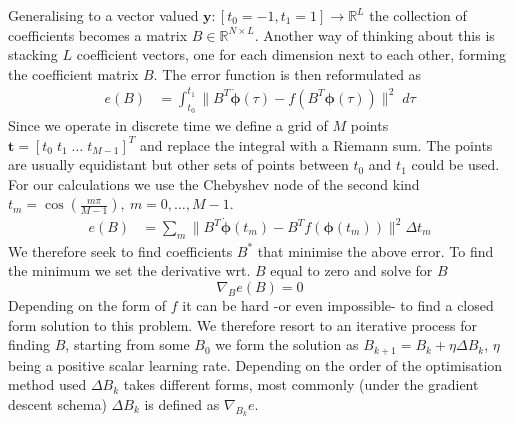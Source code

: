 \documentclass[11pt]{article}
\begin{document}
    Generalising to a vector valued $\pmb{y} : [t_0=-1,t_1=1] \to \mathbb{R}^L$ the collection of coefficients becomes a matrix $B\in \mathbb{R}^{N \times L}$.
    Another way of thinking about this is stacking $L$ coefficient vectors, one for each dimension next to each other, forming the coefficient matrix $B$.
    The error function is then reformulated as
    \begin{align}
        e(B) &= \int_{t_0}^{t_1} \lVert
        B^T \pmb{\dot\phi}(\tau)   -
        f (B^T  \pmb\phi(\tau)  )
        \rVert^2
        \; d\tau
        \label{approx_error}
    \end{align}
    Since we operate in discrete time we define a grid of $M$ points $\pmb{t} = [t_0 \; t_1 \; \dots \; t_{M-1}]^T$ and
    replace the integral with a Riemann sum.
    The points are usually equidistant but other sets of points between $t_0$ and $t_1$ could be used.
    For our calculations we use the Chebyshev node of the second kind $t_m = \cos\left( \frac{m\pi}{M-1} \right), \ m=0,\dots,M-1$.
    \begin{align}
        e(B) &= \sum_m \lVert
        B^T \pmb{\dot\phi}(t_m)  -
        B^T f (  \pmb\phi(t_m)  )
        \rVert^2
        \Delta t_m
        \label{approx_error_sum}
    \end{align}
    We therefore seek to find coefficients $B^*$ that minimise the above error.
    To find the minimum we set the derivative wrt. $B$ equal to zero and solve for $B$
    \begin{equation}
        \label{eq:error_zero}
        \nabla_B e(B) = 0
    \end{equation}
    Depending on the form of $f$ it can be hard -or even impossible- to find a closed form solution to this problem.
    We therefore resort to an iterative process for finding $B$, starting from some $B_0$ we form the solution as
    $B_{k+1} = B_{k} + \eta \Delta B_{k}$, $\eta$ being a positive scalar learning rate.
    Depending on the order of the optimisation method used $\Delta B_{k}$ takes different forms, most
    commonly (under the gradient descent schema) $\Delta B_{k}$ is defined as $\nabla_{B_{k}} e$.
\end{document}
